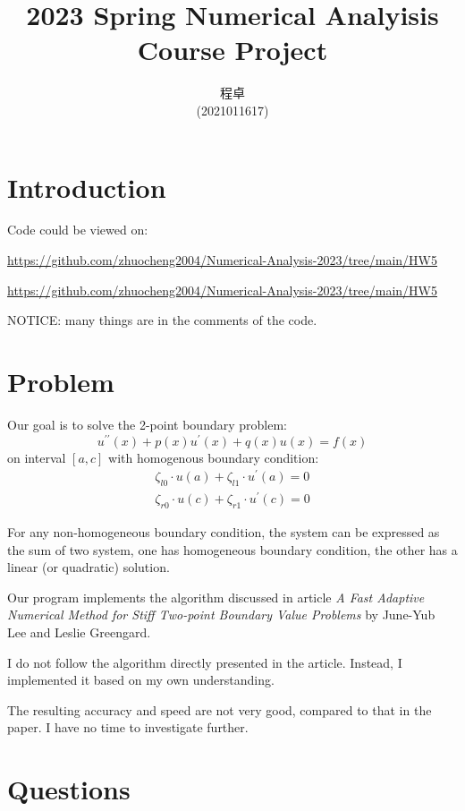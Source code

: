 \documentclass{article}
\title{
    {2023 Spring Numerical Analyisis Course Project}
}
\author{\begin{Chinese}程卓\end{Chinese} (2021011617)}
\begin{document}
\maketitle

\tableofcontents

\section{Introduction}
Code could be viewed on:

\url{https://github.com/zhuocheng2004/Numerical-Analysis-2023/tree/main/HW5}

\url{https://github.com/zhuocheng2004/Numerical-Analysis-2023/tree/main/HW5}

NOTICE: many things are in the comments of the code.

\section{Problem}
Our goal is to solve the 2-point boundary problem:
$$
    u^{\prime\prime}(x) + p(x)u^\prime(x) + q(x)u(x) = f(x)
$$
on interval $[a, c]$
with homogenous boundary condition:
\begin{align}
    \zeta_{l0} \cdot u(a) + \zeta_{l1} \cdot u^\prime(a) = 0 \\
    \zeta_{r0} \cdot u(c) + \zeta_{r1} \cdot u^\prime(c) = 0
\end{align}


For any non-homogeneous boundary condition, 
the system can be expressed as the sum of two system, 
one has homogeneous boundary condition, 
the other has a linear (or quadratic) solution.

Our program implements the algorithm discussed in article 
{\sl A Fast Adaptive Numerical Method for Stiff Two-point Boundary Value Problems}
by June-Yub Lee and Leslie Greengard.

I do not follow the algorithm directly presented in the article. 
Instead, I implemented it based on my own understanding.

The resulting accuracy and speed are not very good, compared to that in the paper.
I have no time to investigate further.

\section{Questions}
\subsection{}
\end{document}
